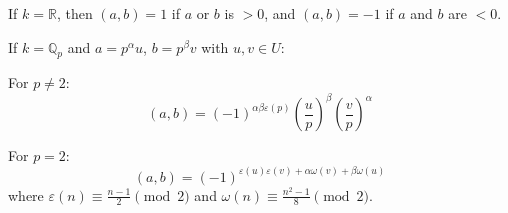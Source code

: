 If $k = \mathbb{R}$, then $(a, b) = 1$ if $a$ or $b$ is $> 0$, and $(a, b) = -1$ if $a$ and $b$ are $< 0$.

If $k = \mathbb{Q}_p$ and $a = p^\alpha u$, $b = p^\beta v$ with $u, v \in U$:

For $p \neq 2$:
$$(a, b) = (-1)^{\alpha\beta \varepsilon(p)} \left(\frac{u}{p}\right)^\beta \left(\frac{v}{p}\right)^\alpha$$

For $p = 2$:
$$(a, b) = (-1)^{\varepsilon(u)\varepsilon(v) + \alpha\omega(v) + \beta\omega(u)}$$
where $\varepsilon(n) \equiv \frac{n-1}{2} \pmod{2}$ and $\omega(n) \equiv \frac{n^2-1}{8} \pmod{2}$.
